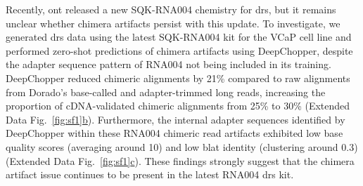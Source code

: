 \documentclass[pdflatex,sn-nature, lineno]{sn-jnl}%
\newcommand{\edfigref}[2]{Extended Data Fig.~\hyperref[#1]{\ref*{#1}#2}}
\theoremstyle{thmstyleone}%
\theoremstyle{thmstyletwo}%
\theoremstyle{thmstylethree}%
\begin{document}
Recently, \gls{ont} released a new SQK-RNA004 chemistry for \gls{drs}, but it remains unclear whether chimera artifacts persist with this update. 
To investigate, we generated \gls{drs} data using the latest SQK-RNA004 kit for the VCaP cell line and performed zero-shot predictions of chimera artifacts using DeepChopper, despite the adapter sequence pattern of RNA004 not being included in its training.
DeepChopper reduced chimeric alignments by 21\% compared to raw alignments from Dorado’s base-called and adapter-trimmed long reads, increasing the proportion of cDNA-validated chimeric alignments from 25\% to 30\% (\edfigref{fig:sf1}{b}).
Furthermore, the internal adapter sequences identified by DeepChopper within these RNA004 chimeric read artifacts exhibited low base quality scores (averaging around 10) and low \gls{blat} identity (clustering around 0.3) (\edfigref{fig:sf1}{c}).
These findings strongly suggest that the chimera artifact issue continues to be present in the latest RNA004 \gls{drs} kit.
\end{document}
